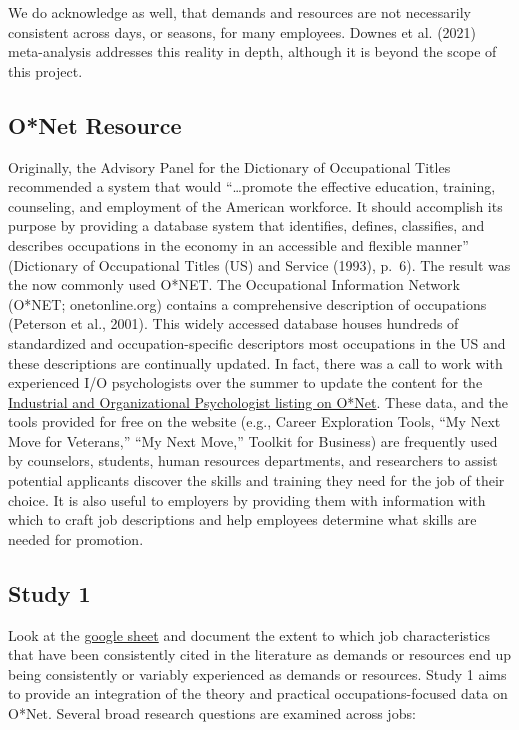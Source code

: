 \documentclass[
  english,
  man]{apa6}
\begin{document}
We do acknowledge as well, that demands and resources are not necessarily consistent across days, or seasons, for many employees. Downes et al. (2021) meta-analysis addresses this reality in depth, although it is beyond the scope of this project.

\hypertarget{onet-resource}{%
\subsection{O*Net Resource}\label{onet-resource}}

Originally, the Advisory Panel for the Dictionary of Occupational Titles recommended a system that would ``\ldots promote the effective education, training, counseling, and employment of the American workforce. It should accomplish its purpose by providing a database system that identifies, defines, classifies, and describes occupations in the economy in an accessible and flexible manner'' (Dictionary of Occupational Titles (US) and Service (1993), p.~6). The result was the now commonly used O*NET. The Occupational Information Network (O*NET; onetonline.org) contains a comprehensive description of occupations (Peterson et al., 2001). This widely accessed database houses hundreds of standardized and occupation-specific descriptors most occupations in the US and these descriptions are continually updated. In fact, there was a call to work with experienced I/O psychologists over the summer to update the content for the \href{https://www.onetonline.org/link/summary/19-3032.00}{Industrial and Organizational Psychologist listing on O*Net}. These data, and the tools provided for free on the website (e.g., Career Exploration Tools, ``My Next Move for Veterans,'' ``My Next Move,'' Toolkit for Business) are frequently used by counselors, students, human resources departments, and researchers to assist potential applicants discover the skills and training they need for the job of their choice. It is also useful to employers by providing them with information with which to craft job descriptions and help employees determine what skills are needed for promotion.

\hypertarget{study-1}{%
\subsection{Study 1}\label{study-1}}

Look at the \href{https://docs.google.com/spreadsheets/d/1ck-72dQ_c-Pl4Xba9W0r__OYo0znlEnV/edit\#gid=1041061499}{google sheet} and document the extent to which job characteristics that have been consistently cited in the literature as demands or resources end up being consistently or variably experienced as demands or resources. Study 1 aims to provide an integration of the theory and practical occupations-focused data on O*Net. Several broad research questions are examined across jobs:
\end{document}
